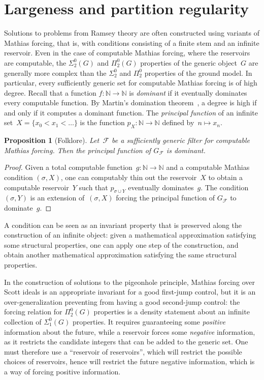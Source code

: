 \documentclass{article}
\def\NN{\mathbb{N}}
\def\F{\mathcal{F}}
\def\qt#1{``#1''}%
\numberwithin{theorem}{section}
\newtheorem{proposition}[theorem]{Proposition}
\theoremstyle{definition}
\begin{document}
\section{Largeness and partition regularity}\label{sect:largeness}

Solutions to problems from Ramsey theory are often constructed using variants of Mathias forcing, that is, with conditions consisting of a finite stem and an infinite reservoir. Even in the case of computable Mathias forcing, where the reservoirs are computable, the $\Sigma^0_2(G)$ and $\Pi^0_2(G)$ properties of the generic object~$G$ are generally more complex than the $\Sigma^0_2$ and $\Pi^0_2$ properties of the ground model. In particular, every sufficiently generic set for computable Mathias forcing is of high degree. Recall that a function $f : \NN \to \NN$ is \emph{dominant} if it eventually dominates every computable function. By Martin's domination theorem~\cite{martin1966classes}, a degree is high if and only if it computes a dominant function. The \emph{principal function} of an infinite set~$X = \{x_0 < x_1 < \dots \}$ is the function $p_X : \NN \to \NN$ defined by~$n \mapsto x_n$.

\begin{proposition}[Folklore]
Let~$\F$ be a sufficiently generic filter for computable Mathias forcing.
Then the principal function of $G_\F$ is dominant.
\end{proposition}
\begin{proof}
Given a total computable function~$g : \NN \to \NN$ and a computable Mathias condition $(\sigma, X)$, one can computably thin out the reservoir~$X$ to obtain a computable reservoir~$Y$ such that $p_{\sigma \cup Y}$ eventually dominates~$g$.
The condition $(\sigma, Y)$ is an extension of~$(\sigma, X)$ forcing the principal function of $G_\F$ to dominate~$g$.
\end{proof}

A condition can be seen as an invariant property that is preserved along the construction of an infinite object: given a mathematical approximation satisfying some structural properties, one can apply one step of the construction, and obtain another mathematical approximation satisfying the same structural properties.

In the construction of solutions to the pigeonhole principle, Mathias forcing over Scott ideals is an appropriate invariant for a good first-jump control, but it is an over-generalization preventing from having a good second-jump control: the forcing relation for $\Pi^0_2(G)$ properties is a density statement about an infinite collection of $\Sigma^0_1(G)$ properties. It requires guaranteeing some \emph{positive} information about the future, while a reservoir forces some \emph{negative} information, as it restricts the candidate integers that can be added to the generic set. One must therefore use a \qt{reservoir of reservoirs}, which will restrict the possible choices of reservoirs, hence will restrict the future negative information, which is a way of forcing positive information.
\end{document}
